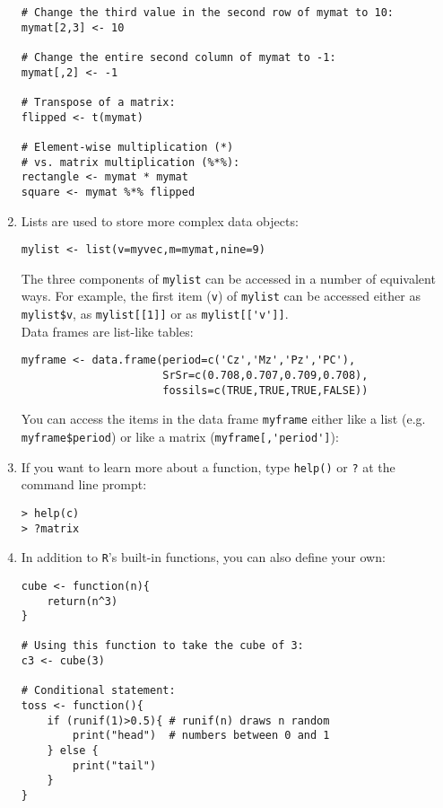 \begin{enumerate}
\begin{verbatim}
# Change the third value in the second row of mymat to 10:
mymat[2,3] <- 10

# Change the entire second column of mymat to -1:
mymat[,2] <- -1

# Transpose of a matrix:
flipped <- t(mymat)

# Element-wise multiplication (*) 
# vs. matrix multiplication (%*%):
rectangle <- mymat * mymat
square <- mymat %*% flipped
\end{verbatim}

\item Lists are used to store more complex data objects:

\begin{verbatim}
mylist <- list(v=myvec,m=mymat,nine=9)
\end{verbatim}

The three components of \texttt{mylist} can be accessed in a number of
equivalent ways. For example, the first item (\texttt{v}) of
\texttt{mylist} can be accessed either as \verb|mylist$v|, as
\verb|mylist[[1]]| or as \verb|mylist[['v']]|.\\

Data frames are list-like tables:

\begin{verbatim}
myframe <- data.frame(period=c('Cz','Mz','Pz','PC'),
                      SrSr=c(0.708,0.707,0.709,0.708),
                      fossils=c(TRUE,TRUE,TRUE,FALSE))
\end{verbatim}

You can access the items in the data frame \texttt{myframe} either
like a list (e.g. \verb|myframe$period|) or like a matrix
(\verb|myframe[,'period']|):

\item If you want to learn more about a function, type \texttt{help()} or
\texttt{?} at the command line prompt:

\begin{verbatim}
> help(c)
> ?matrix
\end{verbatim}

\item In addition to \texttt{R}'s built-in functions, you can also define
  your own:

\begin{verbatim}
cube <- function(n){
    return(n^3)
}

# Using this function to take the cube of 3:
c3 <- cube(3)

# Conditional statement:
toss <- function(){
    if (runif(1)>0.5){ # runif(n) draws n random 
        print("head")  # numbers between 0 and 1
    } else {
        print("tail")
    }
}


\end{verbatim}
\end{enumerate}

